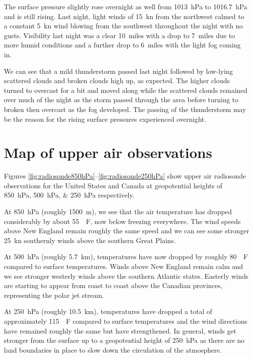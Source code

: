 \documentclass[11pt]{article}
\begin{document}
The surface pressure slightly rose overnight as well from \SI{1013}{\hecto\Pa} to \SI{1016.7}{\hecto\Pa} and is still rising. Last night, light winds of \SI{15}{\knot} from the northwest calmed to a constant \SI{5}{\knot} wind blowing from the southwest throughout the night with no gusts. Visibility last night was a clear \SI{10}{miles} with a drop to \SI{7}{miles} due to more humid conditions and a further drop to \SI{6}{miles} with the light fog coming in.

We can see that a mild thunderstorm passed last night followed by low-lying scattered clouds and broken clouds high up, as expected. The higher clouds turned to overcast for a bit and moved along while the scattered clouds remained over much of the night as the storm passed through the area before turning to broken then overcast as the fog developed. The passing of the thunderstorm may be the reason for the rising surface pressures experienced overnight.

\section{Map of upper air observations}
Figures \ref{fig:radiosonde850hPa}--\ref{fig:radiosonde250hPa} show upper air radiosonde observations for the United States and Canada at geopotential heights of \SIlist{850; 500; 250}{\hecto\Pa} respectively.

At \SI{850}{\hecto\Pa} (roughly \SI{1500}{\m}), we see that the air temperature has dropped considerably by about \SI{55}{\SIUnitSymbolDegree\F}, now below freezing everywhere. The wind speeds above New England remain roughly the same speed and we can see some stronger \SI{25}{\knot} southernly winds above the southern Great Plains.

At \SI{500}{\hecto\Pa} (roughly \SI{5.7}{\km}), temperatures have now dropped by roughly \SI{80}{\SIUnitSymbolDegree\F} compared to surface temperatures. Winds above New England remain calm and we see stronger westerly winds above the southern Atlantic states. Easterly winds are starting to appear from coast to coast above the Canadian provinces, representing the polar jet stream.

At \SI{250}{\hecto\Pa} (roughly \SI{10.5}{\km}), temperatures have dropped a total of approximately \SI{115}{\SIUnitSymbolDegree\F} compared to surface temperatures and the wind directions have remained roughly the same but have strengthened. In general, winds get stronger from the surface up to a geopotential height of \SI{250}{\hecto\Pa} as there are no land boundaries in place to slow down the circulation of the atmosphere.
\end{document}
